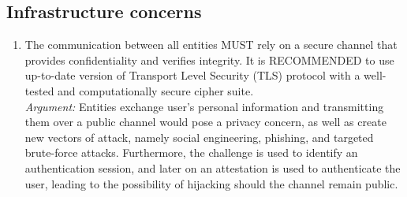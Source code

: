     \subsection{Infrastructure concerns}
        \begin{enumerate}[resume]
            \item The communication between all entities MUST rely on a secure channel that provides confidentiality and 
                  verifies integrity. It is RECOMMENDED to use up-to-date version of Transport Level Security (TLS) protocol 
                  with a well-tested and computationally secure cipher suite.\\      
            \textit{Argument:} Entities exchange user's personal information and transmitting them over a 
                               public channel would pose a privacy concern, as well as create new vectors of attack, 
                               namely social engineering, phishing, and targeted brute-force attacks. Furthermore, 
                               the challenge is used to identify an authentication session, and later on an attestation 
                               is used to authenticate the user, leading to the possibility of hijacking should the channel
                               remain public.                 
        \end{enumerate}
